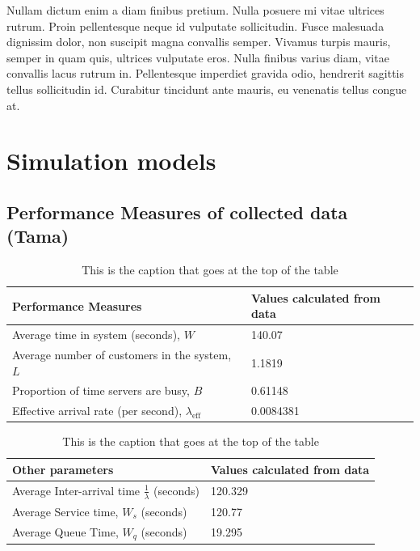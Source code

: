 \documentclass{article}
\begin{document}
Nullam dictum enim a diam finibus pretium. Nulla posuere mi vitae ultrices rutrum. Proin pellentesque neque id vulputate sollicitudin. Fusce malesuada dignissim dolor, non suscipit magna convallis semper. Vivamus turpis mauris, semper in quam quis, ultrices vulputate eros. Nulla finibus varius diam, vitae convallis lacus rutrum in. Pellentesque imperdiet gravida odio, hendrerit sagittis tellus sollicitudin id. Curabitur tincidunt ante mauris, eu venenatis tellus congue at.

\section{Simulation models}

\subsection{Performance Measures of collected data (Tama)}

\begin{table}[h!]
    \centering
    \caption{This is the caption that goes at the top of the table}
    \begin{tabu}{*{2}{X[c]}}
        \toprule
        \textbf{Performance Measures} & \textbf{Values calculated from data}\\
        \midrule
        Average time in system (seconds), $W$   & 140.07 \\
        Average number of customers in the system, $L$ & 1.1819\\
        Proportion of time servers are busy, $B$ & 0.61148  \\
        Effective arrival rate (per second), $\lambda_{\text{eff}}$ & 0.0084381\\
        \bottomrule
    \end{tabu}
    \label{tab:Original Data PF}
\end{table}

\begin{table}[h!]
    \centering
    \caption{This is the caption that goes at the top of the table}
    \begin{tabu}{*{2}{X[c]}}
        \toprule
        \textbf{Other parameters} & \textbf{Values calculated from data} \\
        \midrule
        Average Inter-arrival time $\frac{1}{\lambda}$ (seconds) & 120.329  \\
        Average Service time, $W_s$ (seconds) & 120.77  \\
        Average Queue Time, $W_q$ (seconds) & 19.295  \\
        \bottomrule
    \end{tabu}
    \label{tab:Original Data Other}
\end{table}
\end{document}
